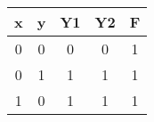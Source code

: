 \begin{tabular}{ |c |c |c |c |c|}  
\hline 
\newline 
\textbf{x} & \textbf{y} & \textbf{Y1} & \textbf{Y2} & \textbf{F} \\
\hline 
 0 & 0 & 0 &0 &1 \\
 \hline
 0 & 1 & 1 &1 &1 \\
 \hline
 1 & 0 & 1 &1 &1 \\
 \hline
 \end{tabular}
